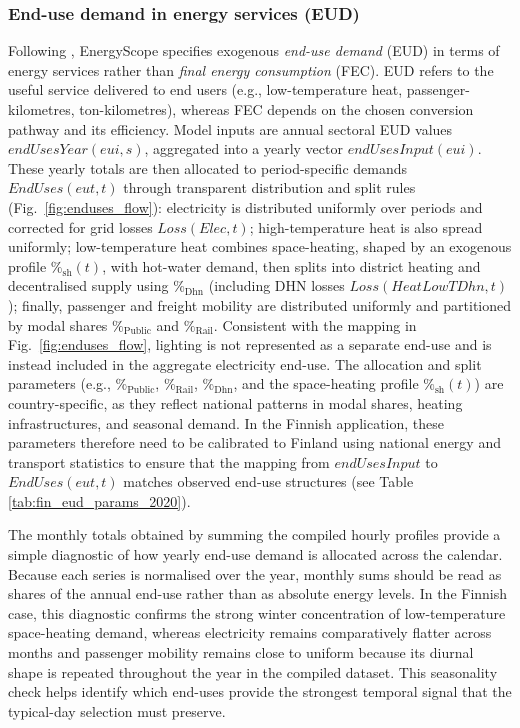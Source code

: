 \documentclass{article}
\begin{document}
\subsubsection{End-use demand in energy services (EUD)}
Following \citet{moretStrategicEnergyPlanning2017}, EnergyScope specifies exogenous \emph{end-use demand} (EUD) in terms of energy services rather than \emph{final energy consumption} (FEC). EUD refers to the useful service delivered to end users (e.g., low-temperature heat, passenger-kilometres, ton-kilometres), whereas FEC depends on the chosen conversion pathway and its efficiency. Model inputs are annual sectoral EUD values $endUsesYear(eui,s)$, aggregated into a yearly vector $endUsesInput(eui)$. These yearly totals are then allocated to period-specific demands $EndUses(eut,t)$ through transparent distribution and split rules (Fig.~\ref{fig:enduses_flow}): electricity is distributed uniformly over periods and corrected for grid losses $Loss(Elec,t)$; high-temperature heat is also spread uniformly; low-temperature heat combines space-heating, shaped by an exogenous profile $\%_{\mathrm{sh}}(t)$, with hot-water demand, then splits into district heating and decentralised supply using $\%_{\mathrm{Dhn}}$ (including DHN losses $Loss(HeatLowTDhn,t)$); finally, passenger and freight mobility are distributed uniformly and partitioned by modal shares $\%_{\mathrm{Public}}$ and $\%_{\mathrm{Rail}}$. Consistent with the mapping in Fig.~\ref{fig:enduses_flow}, lighting is not represented as a separate end-use and is instead included in the aggregate electricity end-use. The allocation and split parameters (e.g., $\%_{\mathrm{Public}}$, $\%_{\mathrm{Rail}}$, $\%_{\mathrm{Dhn}}$, and the space-heating profile $\%_{\mathrm{sh}}(t)$) are country-specific, as they reflect national patterns in modal shares, heating infrastructures, and seasonal demand. In the Finnish application, these parameters therefore need to be calibrated to Finland using national energy and transport statistics to ensure that the mapping from $endUsesInput$ to $EndUses(eut,t)$ matches observed end-use structures (see Table \ref{tab:fin_eud_params_2020}).


The monthly totals obtained by summing the compiled hourly profiles provide a simple diagnostic of how yearly end-use demand is allocated across the calendar. Because each series is normalised over the year, monthly sums should be read as shares of the annual end-use rather than as absolute energy levels. In the Finnish case, this diagnostic confirms the strong winter concentration of low-temperature space-heating demand, whereas electricity remains comparatively flatter across months and passenger mobility remains close to uniform because its diurnal shape is repeated throughout the year in the compiled dataset. This seasonality check helps identify which end-uses provide the strongest temporal signal that the typical-day selection must preserve.
\end{document}
